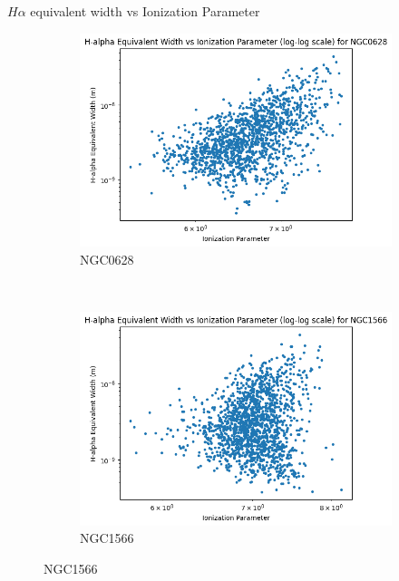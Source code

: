 \documentclass{beamer}
\begin{document}
\begin{frame}{$H\alpha$ equivalent width vs Ionization Parameter}
    \begin{figure}
        \centering
        \begin{subfigure}{0.45\textwidth}
            \includegraphics[scale = 0.25]{image35.png}
            \caption{NGC0628}
        \end{subfigure}
        ~
        \begin{subfigure}{0.45\textwidth}
                \includegraphics[scale = 0.25]{image33.png}
                \caption{NGC1566}
                \label{fig:image6}
        \end{subfigure}
    \end{figure}


\end{frame}
\end{document}
